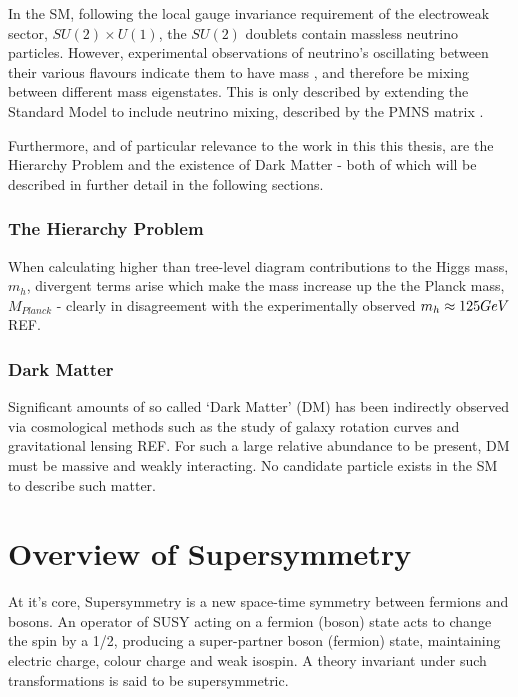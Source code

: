In the SM, following the local gauge invariance requirement of the electroweak
sector, $SU(2)\times U(1)$, the $SU(2)$ doublets contain
massless neutrino particles. However, experimental observations of neutrino's
oscillating between their various flavours indicate them to have mass
\cite{PhysRevLett.81.1562,PhysRevLett.89.011302}, and
therefore be mixing between different mass eigenstates. This is only described
by extending the Standard Model to include neutrino mixing, described by the
PMNS matrix \cite{Altarelli:2002hx}.

Furthermore, and of particular relevance to the work in this this thesis, are
the Hierarchy Problem and the existence of Dark Matter - both of which will be
described in further detail in the following sections.

\subsubsection{The Hierarchy Problem}

When calculating higher than tree-level diagram contributions to the Higgs mass,
$m_h$, divergent terms arise which make the mass increase up the the Planck
mass, $M_{Planck}$ - clearly in disagreement with the experimentally observed
$m_h \approx 125 GeV$ REF.

\subsubsection{Dark Matter}
Significant amounts of so called `Dark Matter' (DM) has been indirectly observed
via cosmological methods such as the study of galaxy rotation curves and
gravitational lensing REF. For such a large relative abundance to be present, DM
must be massive and weakly interacting. No candidate particle exists in the SM
to describe such matter.

\section{Overview of Supersymmetry}  %
\label{sec:theory_overview}
At it's core, Supersymmetry is a new space-time symmetry
between fermions and bosons. An operator of SUSY acting on a fermion (boson)
state acts to change the spin by a 1/2, producing a super-partner boson 
(fermion) state, maintaining electric charge, colour charge and weak isospin. A
theory invariant under such transformations is said to be supersymmetric.

